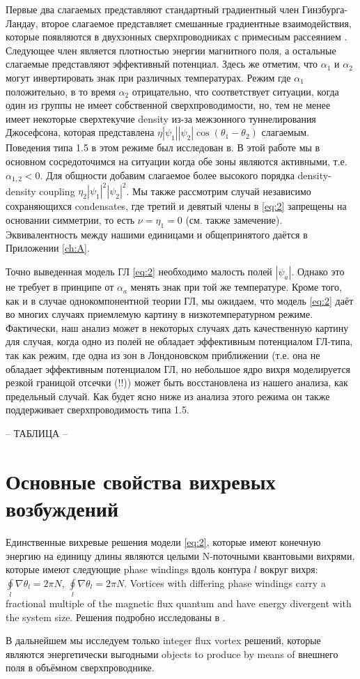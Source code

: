 Первые два слагаемых представляют стандартный градиентный член 
Гинзбурга-Ландау, второе слагаемое представляет смешанные градиентные 
взаимодействия, которые появляются в двухзонных сверхпроводниках с примесным 
рассеянием \cite{bib:8,bib:9}. Следующее член является плотностью энергии 
магнитного поля, а остальные слагаемые представляют эффективный потенциал. 
Здесь же отметим, что \( \alpha_1 \) и \( \alpha_2 \) могут инвертировать знак 
при различных температурах. Режим где \( \alpha_1 \) положительно, в то время 
\( \alpha_2 \) отрицательно, что соответствует ситуации, когда один из группы 
не имеет собственной сверхпроводимости, но, тем не менее имеет некоторые 
сверхтекучие density из-за межзонного туннелирования Джосефсона, которая 
представлена \( \eta|\psi_1||\psi_2|\cos(\theta_1-\theta_2) \) слагаемым. 
Поведения типа 1.5 в этом режиме был исследован в\cite{bib:2}. В этой работе 
мы в основном сосредоточимся на ситуации когда обе зоны являются активными, 
т.е. \( \alpha_{1,2} < 0 \). Для общности добавим слагаемое более высокого 
порядка density-density coupling \( \eta_2|\psi_1|^2|\psi_2|^2 \). Мы также 
рассмотрим случай независимо сохраняющихся condensates, где третий и девятый 
члены в \eqref{eq:2} запрещены на основании симметрии, то есть 
\( \nu = \eta_1 = 0 \) (см. также замечение\cite{bib:21}). Эквивалентность 
между нашими единицами и общепринятого даётся в Приложении \ref{ch:A}.

Точно выведенная модель ГЛ \eqref{eq:2} необходимо малость полей \( |\psi_a| \). 
Однако это не требует в принципе от \( \alpha_a \) менять знак при той же 
температуре. Кроме того, как и в случае однокомпонентной теории ГЛ, мы 
ожидаем, что модель \eqref{eq:2} даёт во многих случаях приемлемую картину в 
низкотемпературном режиме. Фактически, наш анализ может в некоторых случаях 
дать качественную картину для случая, когда одно из полей не обладает 
эффективным потенциалом ГЛ-типа, так как режим, где одна из зон в Лондоновском 
приближении (т.е. она не обладает эффективным потенциалом ГЛ, но небольшое ядро 
вихря моделируется резкой границой отсечки (!!)) может быть восстановлена из нашего 
анализа, как предельный случай. Как будет ясно ниже из анализа этого режима он 
также поддерживает сверхпроводимость типа 1.5.

-- ТАБЛИЦА --

\section{Основные свойства вихревых возбуждений}
\label{sec:2-2}

Единственные вихревые решения модели \eqref{eq:2}, которые имеют конечную 
энергию на единицу длины являются целыми N-поточными квантовыми вихрями, 
которые имеют следующие phase windings вдоль контура \( l \) вокруг вихря: 
\( \oint\limits_l \nabla\theta_l = 2\pi N \), 
\( \oint\limits_l \nabla\theta_l = 2\pi N \). Vortices with differing phase 
windings carry a fractional multiple of the magnetic flux quantum and have 
energy divergent with the system size. Решения подробно исследованы в
\cite{bib:22}.

В дальнейшем мы исследуем только integer flux vortex решений, которые 
являются энергетически выгодными objects to produce by means of внешнего поля 
в объёмном сверхпроводнике.